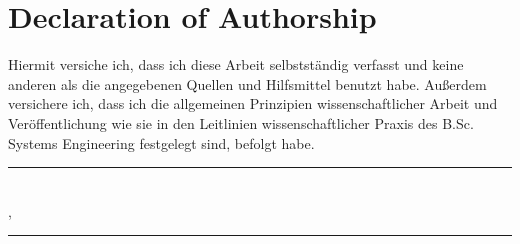\thispagestyle{empty}
\vspace*{0.6\textheight}
\noindent

\section*{Declaration of Authorship}

Hiermit versiche ich, dass ich diese Arbeit selbstständig verfasst und keine anderen als die angegebenen Quellen und Hilfsmittel benutzt habe. Außerdem versichere ich, dass ich die allgemeinen Prinzipien wissenschaftlicher Arbeit und Veröffentlichung wie sie in den Leitlinien wissenschaftlicher Praxis des B.Sc. Systems Engineering festgelegt sind, befolgt habe. 

\vspace{15mm}

\noindent
\begin{minipage}[t]{0.45\textwidth} %
    \rule[0pt]{4cm}{0.4pt} \\ %
    \getSubmissionLocation{}, \getSubmissionDate{} %
\end{minipage}%
\hspace{2cm} %
\begin{minipage}[t]{0.45\textwidth} %
    \rule[0pt]{4cm}{0.4pt} \\ %
    \hspace{20mm} \getAuthor{} %
\end{minipage}



\cleardoublepage{}
